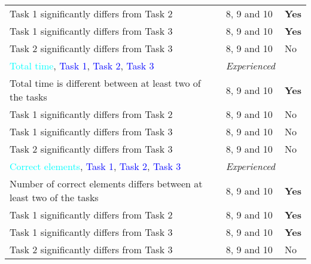 \begin{longtable}{p{}|p{}|p{}}
		Task 1 significantly differs from Task 2 & 8, 9 and 10 & \textbf{Yes}  \\ 
		Task 1 significantly differs from Task 3 & 8, 9 and 10 & \textbf{Yes}  \\ 
		Task 2 significantly differs from Task 3 & 8, 9 and 10 & No  \\ \hline
		\textcolor{cyan}{Total time}, \textcolor{blue}{Task 1}, \textcolor{blue}{Task 2}, \textcolor{blue}{Task 3} & \textit{Experienced}  &  \\
		Total time is different between at least two of the tasks & 8, 9 and 10 & \textbf{Yes}  \\
		Task 1 significantly differs from Task 2 & 8, 9 and 10 & No  \\ 
		Task 1 significantly differs from Task 3 & 8, 9 and 10 & No  \\ 
		Task 2 significantly differs from Task 3 & 8, 9 and 10 & No  \\ \hline
		\textcolor{cyan}{Correct elements}, \textcolor{blue}{Task 1}, \textcolor{blue}{Task 2}, \textcolor{blue}{Task 3} & \textit{Experienced}  &  \\
		Number of correct elements differs between at least two of the tasks & 8, 9 and 10 & \textbf{Yes}  \\
		Task 1 significantly differs from Task 2 & 8, 9 and 10 & \textbf{Yes}  \\ 
		Task 1 significantly differs from Task 3 & 8, 9 and 10 & \textbf{Yes} \\ 
		Task 2 significantly differs from Task 3 & 8, 9 and 10 & No  \\ \hline
	\end{longtable}
